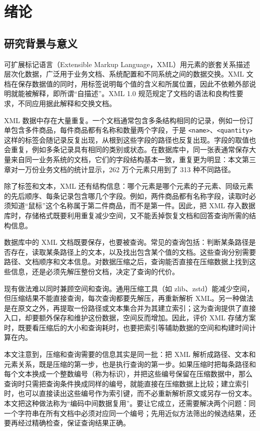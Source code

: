 \chapter{绪论}

\section{研究背景与意义}

可扩展标记语言（Extensible Markup Language，XML）用元素的嵌套关系描述层次化数据，广泛用于业务文档、系统配置和不同系统之间的数据交换。XML 文档在保存数据值的同时，用标签说明每个值的含义和所属位置，因此不依赖外部说明就能被解释，即所谓“自描述”。XML 1.0 规范规定了文档的语法和良构性要求，不同应用据此解释和交换文档\cite{w3c2008xml}。

XML 数据中存在大量重复。一个文档通常包含多条结构相同的记录，例如一份订单包含多件商品，每件商品都有名称和数量两个字段，于是 \texttt{<name>}、\texttt{<quantity>} 这样的标签会随记录反复出现，从根到这些字段的路径也反复出现。字段的取值也会重复，例如多条记录具有相同的类别或状态。在数据库中，同一张表通常保存大量来自同一业务系统的文档，它们的字段结构基本一致，重复更为明显：本文第三章对一万份业务文档的统计显示，262 万个元素只用到了 313 种不同路径。

除了标签和文本，XML 还有结构信息：哪个元素是哪个元素的子元素、同级元素的先后顺序、每条记录包含哪几个字段。例如，两件商品都有名称字段，读取时必须知道“鼠标”这个名称属于第二件商品，而不是第一件。因此，把 XML 存入数据库时，存储格式既要利用重复减少空间，又不能丢掉恢复文档和回答查询所需的结构信息。

数据库中的 XML 文档既要保存，也要被查询。常见的查询包括：判断某条路径是否存在，读取某条路径上的文本，以及找出包含某个值的文档。这些查询分别需要路径、文档顺序和文本信息。对数据压缩之后，查询能否直接在压缩数据上找到这些信息，还是必须先解压整份文档，决定了查询的代价。

现有做法难以同时兼顾空间和查询。通用压缩工具（如 zlib、zstd）能减少空间，但压缩结果不能直接查询，每次查询都要先解压，再重新解析 XML。另一种做法是在原文之外，再提取一份路径或文本集合并为其建立索引；这为查询提供了直接入口，却要额外保存和维护这份数据，空间反而增加。因此，评价 XML 存储方案时，既要看压缩后的大小和查询耗时，也要把索引等辅助数据的空间和构建时间计算在内。

本文注意到，压缩和查询需要的信息其实是同一批：把 XML 解析成路径、文本和元素关系，既是压缩的第一步，也是执行查询的第一步。如果压缩时把每条路径和每个文本换成一个整数编号（称为标识），并把这些编号保留在压缩数据中，那么查询时只需把查询条件换成同样的编号，就能直接在压缩数据上比较；建立索引时，也可以直接读出这些编号作为索引键，而不必重新解析原文或另存一份文本。本文把这种做法称为“编码中间数据复用”。要让它成立，还需要解决两个问题：同一个字符串在所有文档中必须对应同一个编号；先用近似方法筛出的候选结果，还要再经过精确检查，保证查询结果正确。

